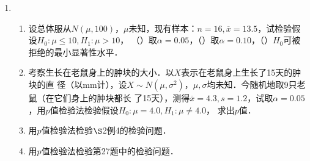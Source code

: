 \documentclass[10pt,a4paper]{article}
\begin{document}
\begin{enumerate}
    \item \begin{enumerate}
        \item 设总体服从$N(\mu, 100)$，$\mu$未知，现有样本：$n=16,\overline{x}=13.5$，试检验假设$H_0:\mu\leq 10,H_1:\mu>10$，
        （）取$\alpha=0.05$，（）取$\alpha=0.10$，（）$H_0$可被拒绝的最小显著性水平．
        \item 考察生长在老鼠身上的肿块的大小．以$X$表示在老鼠身上生长了15天的肿块的直
        径（以mm计），设$X\sim N(\mu,\sigma^2)$，$\mu,\sigma$均未知．今随机地取9只老鼠（在它们身上的肿块都长
        了15天），测得$\overline{x}=4.3,s=1.2$，试取$\alpha=0.05$，用$p$值检验法检验假设$H_0:\mu=4.0,H_1:\mu\neq 4.0$，
        求出$p$值．
        \item 用$p$值检验法检验$\S$2例4的检验问题．
        \item 用$p$值检验法检验第27题中的检验问题．
        

    \end{enumerate}




  

\end{enumerate}
\end{document}
